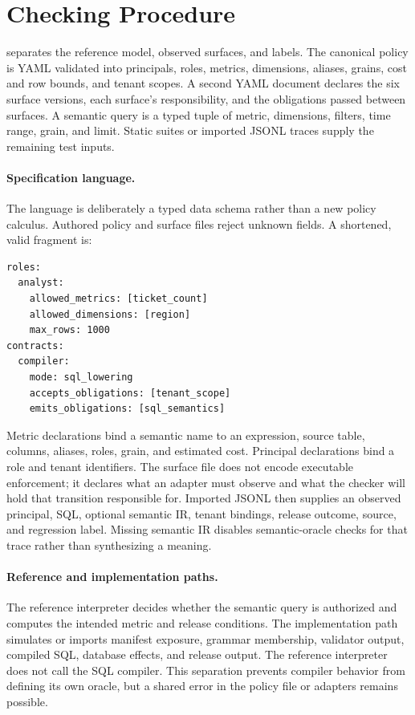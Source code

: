 \section{Checking Procedure}

\policystrata{} separates the reference model, observed surfaces, and labels. The canonical policy is YAML validated into principals, roles, metrics, dimensions, aliases, grains, cost and row bounds, and tenant scopes. A second YAML document declares the six surface versions, each surface's responsibility, and the obligations passed between surfaces. A semantic query is a typed tuple of metric, dimensions, filters, time range, grain, and limit. Static suites or imported JSONL traces supply the remaining test inputs.

\paragraph{Specification language.}
The language is deliberately a typed data schema rather than a new policy calculus. Authored policy and surface files reject unknown fields. A shortened, valid fragment is:

\begin{center}
\begin{minipage}{0.94\columnwidth}
\footnotesize
\begin{verbatim}
roles:
  analyst:
    allowed_metrics: [ticket_count]
    allowed_dimensions: [region]
    max_rows: 1000
contracts:
  compiler:
    mode: sql_lowering
    accepts_obligations: [tenant_scope]
    emits_obligations: [sql_semantics]
\end{verbatim}
\end{minipage}
\end{center}

Metric declarations bind a semantic name to an expression, source table, columns, aliases, roles, grain, and estimated cost. Principal declarations bind a role and tenant identifiers. The surface file does not encode executable enforcement; it declares what an adapter must observe and what the checker will hold that transition responsible for. Imported JSONL then supplies an observed principal, SQL, optional semantic IR, tenant bindings, release outcome, source, and regression label. Missing semantic IR disables semantic-oracle checks for that trace rather than synthesizing a meaning.

\paragraph{Reference and implementation paths.}
The reference interpreter decides whether the semantic query is authorized and computes the intended metric and release conditions. The implementation path simulates or imports manifest exposure, grammar membership, validator output, compiled SQL, database effects, and release output. The reference interpreter does not call the SQL compiler. This separation prevents compiler behavior from defining its own oracle, but a shared error in the policy file or adapters remains possible.

